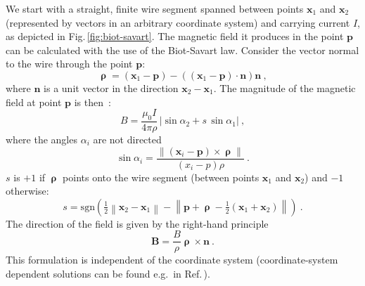 We start with a straight, finite wire segment spanned between points $\mathbf{x}_1$ and $\mathbf{x}_2$ (represented by vectors in an arbitrary coordinate system) and carrying current $I$, as depicted in Fig.\,\ref{fig:biot-savart}. The magnetic field it produces in the point $\mathbf{p}$ can be calculated with the use of the Biot-Savart law. Consider the vector normal to the wire through the point $\mathbf{p}$:
\begin{equation}
  \boldsymbol{\uprho} = (\mathbf{x}_1 - \mathbf{p}) - \left( \left( \mathbf{x}_1 - \mathbf{p} \right) \cdot \mathbf{n} \right)\mathbf{n} \ ,
\end{equation}
where $\mathbf{n}$ is a unit vector in the direction $\mathbf{x}_2 -\mathbf{x}_1$.
The magnitude of the magnetic field at point $\mathbf{p}$ is then~\cite{Griffith}:
\begin{equation}
  \label{eq:biot_savart}
  B = \frac{\mu_0 I}{4 \pi \rho} \, \left| \sin \alpha_2 + s\, \sin \alpha_1 \right| \ ,
\end{equation}
where the angles $\alpha_i$ are not directed
\begin{equation}
  \sin \alpha_i = \frac{ \left\lVert \left( \mathbf{x}_i - \mathbf{p} \right) \times \boldsymbol{\uprho} \right\rVert }{ (x_i  - p) \rho } \ .
\end{equation}
$s$ is $+1$ if $\boldsymbol{\uprho}$ points onto the wire segment (between points $\mathbf{x}_1$ and $\mathbf{x}_2$) and $-1$ otherwise:
\begin{equation}
  s = \mathrm{sgn}\left( \tfrac{1}{2} \left\lVert \mathbf{x}_2 - \mathbf{x}_1 \right\rVert -
  \left\lVert \mathbf{p} + \boldsymbol{\uprho} - \tfrac{1}{2} \left( \mathbf{x}_1 + \mathbf{x}_2 \right) \right\rVert \right) \ .
\end{equation}
The direction of the field is given by the right-hand principle
\begin{equation}
  \mathbf{B} = \frac{B}{\rho} \boldsymbol{\uprho} \times \mathbf{n} \ .
\end{equation}
This formulation is independent of the coordinate system (coordinate-system dependent solutions can be found e.g.\ in Ref.\,\cite{Grivich2000}).

